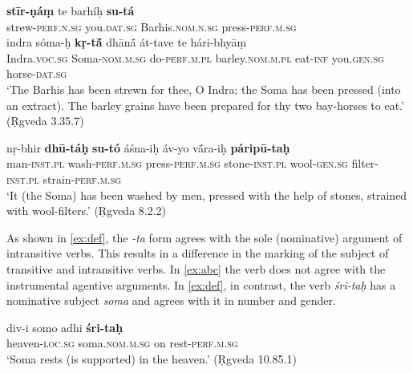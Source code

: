 \documentclass[output=paper,
modfonts
]{LSP/langsci}
\begin{document}
\begin{exe}
	\ex\label{ex:abc}
	\begin{xlist}
		\ex\label{ex:stirnam}\gll \textbf{stīr-ṇáṃ} te barhíḥ \textbf{su-tá}  \\
		strew-\textsc{perf.n.sg} you.\textsc{dat.sg} Barhis.\textsc{nom.n.sg} press-\textsc{perf.m.sg} \\
		
		\gll indra sóma-ḥ  \textbf{kṛ-tā́} dhānā́ át-tave  te hári-bhyāṃ\\
Indra.\textsc{voc.sg} Soma-\textsc{nom.m.sg}  do-\textsc{perf.m.pl}  barley.\textsc{nom.m.pl} eat-\textsc{inf}  you.\textsc{gen.sg} horse-\textsc{dat.sg}\\
\glt `The Barhis has been strewn for thee, O Indra; the Soma  has been pressed (into an extract). The barley grains  have been prepared for thy two bay-horses to eat.' (Ṛgveda 3.35.7)

		\ex\label{ex:nrbhir}\gll nṛ-bhir \textbf{dhū-táḥ}  \textbf{su-tó}  áśna-iḥ áv-yo vā́ra-iḥ \textbf{páripū-taḥ}  \\
		man-\textsc{inst.pl}  wash-\textsc{perf.m.sg}  press-\textsc{perf.m.sg}  stone-\textsc{inst.pl}  wool-\textsc{gen.sg}  filter-\textsc{inst.pl}  strain-\textsc{perf.m.sg} \\
		\glt `It (the Soma) has been washed  by men, pressed with the help of stones, strained with  wool-filters.' (Ṛgveda 8.2.2)
	\end{xlist}
\end{exe}


As shown in \cref{ex:def}, the \textit{-ta} form agrees with the sole
(nominative) argument of intransitive verbs. This results in a
difference in the marking of the subject  of transitive and
intransitive verbs. In \cref{ex:abc} the verb does not agree with the
instrumental agentive arguments.  In \cref{ex:def}, in contrast, the
verb \textit{śri-taḥ} has a nominative subject \textit{soma}  and
agrees with it in number and gender. 

\begin{exe}
\ex\label{ex:def}\gll div-i somo adhi \textbf{śri-taḥ} \\
heaven-\textsc{loc.sg} soma.\textsc{nom.m.sg} on rest-\textsc{perf.m.sg} \\
\glt `Soma rests (is supported) in the heaven.' (Ṛgveda 10.85.1)
\end{exe}
\end{document}
